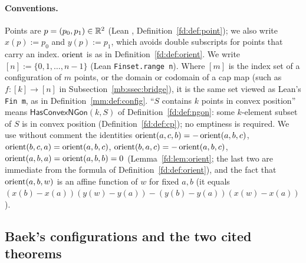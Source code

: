 \paragraph{Conventions.}
Points are $p=(p_0,p_1)\in\mathbb R^2$ (Lean , Definition~\ref{fd:def:point}); we also write $x(p):=p_0$ and
$y(p):=p_1$, which avoids double subscripts for points that carry an index. $\operatorname{orient}$ is as in
Definition~\ref{fd:def:orient}. We write
$[n]:=\{0,1,\dots,n-1\}$ (Lean \texttt{Finset.range n}). Where $[m]$ is the index set of a configuration of $m$
points, or the domain or codomain of a cap map (such as $f\colon[k]\to[n]$ in Subsection~\ref{mb:ssec:bridge}), it is
the same set viewed as Lean's \texttt{Fin m}, as in Definition~\ref{mm:def:config}.
``$S$ contains $k$ points in convex position'' means
$\mathsf{HasConvexNGon}(k,S)$ of Definition~\ref{fd:def:ngon}: some $k$-element subset of $S$ is in convex position
(Definition~\ref{fd:def:cp}); no emptiness is required. We use without comment the identities
$\operatorname{orient}(a,c,b)=-\operatorname{orient}(a,b,c)$, $\operatorname{orient}(b,c,a)=\operatorname{orient}(a,b,c)$, $\operatorname{orient}(b,a,c)=-\operatorname{orient}(a,b,c)$,
$\operatorname{orient}(a,b,a)=\operatorname{orient}(a,b,b)=0$ (Lemma~\ref{fd:lem:orient}; the last two are immediate from the formula of
Definition~\ref{fd:def:orient}), and the fact that $\operatorname{orient}(a,b,w)$ is an affine function
of $w$ for fixed $a,b$ (it equals $(x(b)-x(a))(y(w)-y(a))-(y(b)-y(a))(x(w)-x(a))$).

\subsection{Baek's configurations and the two cited theorems}\label{mb:ssec:baek}

